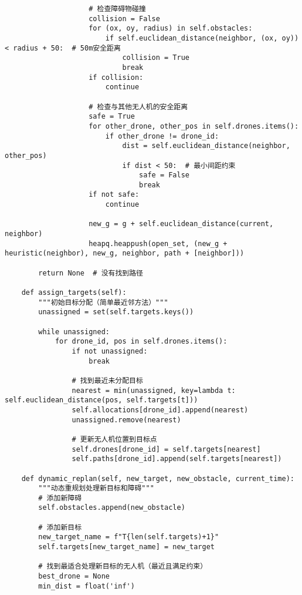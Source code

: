 \documentclass[12pt,fontset=adobe]{ctexart}
\begin{document}
\begin{verbatim}
                    # 检查障碍物碰撞
                    collision = False
                    for (ox, oy, radius) in self.obstacles:
                        if self.euclidean_distance(neighbor, (ox, oy)) < radius + 50:  # 50m安全距离
                            collision = True
                            break
                    if collision:
                        continue
                    
                    # 检查与其他无人机的安全距离
                    safe = True
                    for other_drone, other_pos in self.drones.items():
                        if other_drone != drone_id:
                            dist = self.euclidean_distance(neighbor, other_pos)
                            if dist < 50:  # 最小间距约束
                                safe = False
                                break
                    if not safe:
                        continue
                    
                    new_g = g + self.euclidean_distance(current, neighbor)
                    heapq.heappush(open_set, (new_g + heuristic(neighbor), new_g, neighbor, path + [neighbor]))
        
        return None  # 没有找到路径
    
    def assign_targets(self):
        """初始目标分配（简单最近邻方法）"""
        unassigned = set(self.targets.keys())
        
        while unassigned:
            for drone_id, pos in self.drones.items():
                if not unassigned:
                    break
                
                # 找到最近未分配目标
                nearest = min(unassigned, key=lambda t: self.euclidean_distance(pos, self.targets[t]))
                self.allocations[drone_id].append(nearest)
                unassigned.remove(nearest)
                
                # 更新无人机位置到目标点
                self.drones[drone_id] = self.targets[nearest]
                self.paths[drone_id].append(self.targets[nearest])
    
    def dynamic_replan(self, new_target, new_obstacle, current_time):
        """动态重规划处理新目标和障碍"""
        # 添加新障碍
        self.obstacles.append(new_obstacle)
        
        # 添加新目标
        new_target_name = f"T{len(self.targets)+1}"
        self.targets[new_target_name] = new_target
        
        # 找到最适合处理新目标的无人机（最近且满足约束）
        best_drone = None
        min_dist = float('inf')
        

\end{verbatim}
\end{document}
